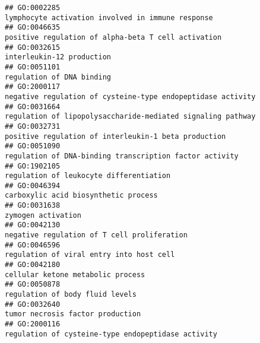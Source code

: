 \documentclass[
]{article}
\begin{document}
\begin{verbatim}
## GO:0002285                                                                                                lymphocyte activation involved in immune response
## GO:0046635                                                                                              positive regulation of alpha-beta T cell activation
## GO:0032615                                                                                                                        interleukin-12 production
## GO:0051101                                                                                                                        regulation of DNA binding
## GO:2000117                                                                                      negative regulation of cysteine-type endopeptidase activity
## GO:0031664                                                                                      regulation of lipopolysaccharide-mediated signaling pathway
## GO:0032731                                                                                             positive regulation of interleukin-1 beta production
## GO:0051090                                                                                          regulation of DNA-binding transcription factor activity
## GO:1902105                                                                                                          regulation of leukocyte differentiation
## GO:0046394                                                                                                             carboxylic acid biosynthetic process
## GO:0031638                                                                                                                               zymogen activation
## GO:0042130                                                                                                      negative regulation of T cell proliferation
## GO:0046596                                                                                                         regulation of viral entry into host cell
## GO:0042180                                                                                                                cellular ketone metabolic process
## GO:0050878                                                                                                                  regulation of body fluid levels
## GO:0032640                                                                                                                 tumor necrosis factor production
## GO:2000116                                                                                               regulation of cysteine-type endopeptidase activity

\end{verbatim}
\end{document}
